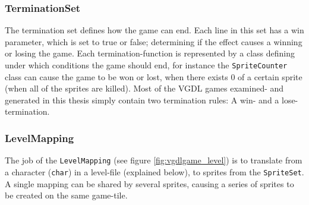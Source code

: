 \documentclass[a4paper,titlepage,final]{report}
\begin{document}
\subsubsection*{TerminationSet}
The termination set defines how the game can end. 
Each line in this set has a win parameter, which is set to true or false; determining if the effect causes a winning or losing the game.
Each termination-function is represented by a class defining under which conditions the game should end, for instance the \texttt{SpriteCounter} class can cause the game to be won or lost, when there exists 0 of a certain sprite  (when all of the sprites are killed).
Most of the VGDL games examined- and generated in this thesis simply contain two termination rules: 
A win- and a lose- termination.

\subsubsection*{LevelMapping}
The job of the \texttt{LevelMapping} (see figure \ref{fig:vgdlgame_level}) is to translate from a character (\texttt{char}) in a level-file (explained below), to sprites from the \texttt{SpriteSet}. 
A single mapping can be shared by several sprites, causing a series of sprites to be created on the same game-tile.
\end{document}

